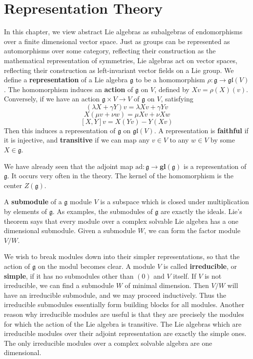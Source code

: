 \chapter{Representation Theory}

In this chapter, we view abstract Lie algebras as subalgebras of endomorphisms over a finite dimensional vector space. Just as groups can be represented as automorphisms over some category, reflecting their construction as the mathematical representation of symmetries, Lie algebras act on vector spaces, reflecting their construction as left-invariant vector fields on a Lie group. We define a {\bf representation} of a Lie algebra $\mathfrak{g}$ to be a homomorphism $\rho: \mathfrak{g} \to \mathfrak{gl}(V)$. The homomorphism induces an {\bf action} of $\mathfrak{g}$ on $V$, defined by $Xv = \rho(X)(v)$. Conversely, if we have an action $\mathfrak{g} \times V \to V$ of $\mathfrak{g}$ on $V$, satisfying
%
\[ (\lambda X + \gamma Y)v = \lambda Xv + \gamma Yv \]
\[ X(\mu v + \nu w) = \mu Xv + \nu Xw \]
\[ [X,Y] v = X(Yv) - Y(Xv) \]
%
Then this induces a representation of $\mathfrak{g}$ on $\mathfrak{gl}(V)$. A representation is {\bf faithful} if it is injective, and {\bf transitive} if we can map any $v \in V$ to any $w \in V$ by some $X \in \mathfrak{g}$.

\begin{example}
    We have already seen that the adjoint map $\text{ad}: \mathfrak{g} \to \mathbf{gl}(\mathfrak{g})$ is a representation of $\mathfrak{g}$. It occurs very often in the theory. The kernel of the homomorphism is the center $Z(\mathfrak{g})$.
\end{example}

A {\bf submodule} of a $\mathfrak{g}$ module $V$ is a subspace which is closed under multiplication by elements of $\mathfrak{g}$. As examples, the submodules of $\mathfrak{g}$ are exactly the ideals. Lie's theorem says that every module over a complex solvable Lie algebra has a one dimensional submodule. Given a submodule $W$, we can form the factor module $V/W$.

We wish to break modules down into their simpler representations, so that the action of $\mathfrak{g}$ on the modul becomes clear. A module $V$ is called {\bf irreducible}, or {\bf simple}, if it has no submodules other than $(0)$ and $V$ itself. If $V$ is not irreducible, we can find a submodule $W$ of minimal dimension. Then $V/W$ will have an irreducible submodule, and we may proceed inductively. Thus the irreducible submodules essentially form building blocks for all modules. Another reason why irreducible modules are useful is that they are precisely the modules for which the action of the Lie algebra is transitive. The Lie algebras which are irreducible modules over their adjoint representation are exactly the simple ones. The only irreducible modules over a complex solvable algebra are one dimensional.

